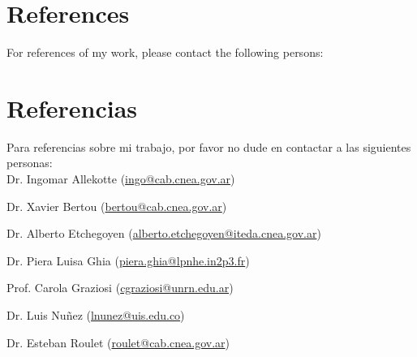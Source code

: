 \ifeng
\section*{References}

For references of my work, please contact the following persons:\\
\else
\section*{Referencias}

Para referencias sobre mi trabajo, por favor no dude en contactar a las siguientes personas:\\

\fi
Dr. Ingomar Allekotte (\href{mailto:ingo@cab.cnea.gov.ar}{ingo@cab.cnea.gov.ar})

Dr. Xavier Bertou (\href{mailto:bertou@cab.cnea.gov.ar}{bertou@cab.cnea.gov.ar})

Dr. Alberto Etchegoyen (\href{mailto:alberto.etchegoyen@iteda.cnea.gov.ar}{alberto.etchegoyen@iteda.cnea.gov.ar})

Dr. Piera Luisa Ghia (\href{mailto:piera.ghia@lpnhe.in2p3.fr}{piera.ghia@lpnhe.in2p3.fr})

Prof. Carola Graziosi (\href{mailto:cgraziosi@unrn.edu.ar}{cgraziosi@unrn.edu.ar})

Dr. Luis Nuñez (\href{mailto:lnunez@uis.edu.co}{lnunez@uis.edu.co})

Dr. Esteban Roulet (\href{mailto:roulet@cab.cnea.gov.ar}{roulet@cab.cnea.gov.ar})



